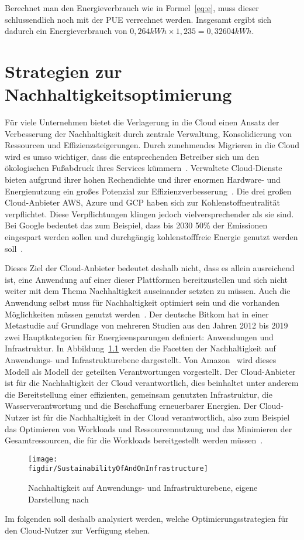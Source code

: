 Berechnet man den Energieverbrauch wie in Formel~\ref{eq:e}, muss dieser schlussendlich noch mit der \ac{PUE} verrechnet werden.
Insgesamt ergibt sich dadurch ein Energieverbrauch von $0,264kWh \times 1,235 = 0,32604kWh$.
\chapter{Strategien zur Nachhaltigkeitsoptimierung}\label{CAP:strategies}
Für viele Unternehmen bietet die Verlagerung in die Cloud einen Ansatz der Verbesserung der Nachhaltigkeit durch zentrale Verwaltung, Konsolidierung von Ressourcen und Effizienzsteigerungen.
Durch zunehmendes Migrieren in die Cloud wird es umso wichtiger, dass die entsprechenden Betreiber sich um den ökologischen Fußabdruck ihres Services kümmern~\cite{Buchanan.2023}.
Verwaltete Cloud-Dienste bieten aufgrund ihrer hohen Rechendichte und ihrer enormen Hardware- und Energienutzung ein großes Potenzial zur Effizienzverbesserung~\cite{Currie.2024}.
Die drei großen Cloud-Anbieter \ac{AWS}, Azure und \ac{GCP} haben sich zur Kohlenstoffneutralität verpflichtet.
Diese Verpflichtungen klingen jedoch vielversprechender als sie sind.
Bei Google bedeutet das zum Beispiel, dass bis 2030 50\% der Emissionen eingespart werden sollen und durchgängig kohlenstofffreie Energie genutzt werden soll~\cite{Google.2023}.

Dieses Ziel der Cloud-Anbieter bedeutet deshalb nicht, dass es allein ausreichend ist, eine Anwendung auf einer dieser Plattformen bereitzustellen und sich nicht weiter mit dem Thema Nachhaltigkeit auseinander setzten zu müssen.
Auch die Anwendung selbst muss für Nachhaltigkeit optimiert sein und die vorhanden Möglichkeiten müssen genutzt werden~\cite{Newman.2023}.
Der deutsche Bitkom hat in einer Metastudie auf Grundlage von mehreren Studien aus den Jahren 2012 bis 2019 zwei Hauptkategorien für Energieensparungen definiert: Anwendungen und Infrastruktur.
In Abbildung~\ref{FIG:sustainability-infrastructure} werden die Facetten der Nachhaltigkeit auf Anwendungs- und Infrastrukturebene dargestellt.
Von Amazon~\cite{Mokhtari.2023} wird dieses Modell als Modell der geteilten Verantwortungen vorgestellt.
Der Cloud-Anbieter ist für die Nachhaltigkeit der Cloud verantwortlich, dies beinhaltet unter anderem die Bereitstellung einer effizienten, gemeinsam genutzten Infrastruktur, die Wasserverantwortung und die Beschaffung erneuerbarer Energien.
Der Cloud-Nutzer ist für die Nachhaltigkeit in der Cloud verantwortlich, also zum Beispiel das Optimieren von Workloads und Ressourcennutzung und das Minimieren der Gesamtressourcen, die für die Workloads bereitgestellt werden müssen~\cite{Mokhtari.2023}.
\begin{figure}
 \caption[Nachhaltigkeit auf Anwendungs- und Infrastrukturebene]{Nachhaltigkeit auf Anwendungs- und Infrastrukturebene, eigene Darstellung nach ~\cite{Mokhtari.2023}}
 {\texttt{[image: \\figdir/SustainabilityOfAndOnInfrastructure]}}
 \label{FIG:sustainability-infrastructure}
\end{figure}
Im folgenden soll deshalb analysiert werden, welche Optimierungsstrategien für den Cloud-Nutzer zur Verfügung stehen.

